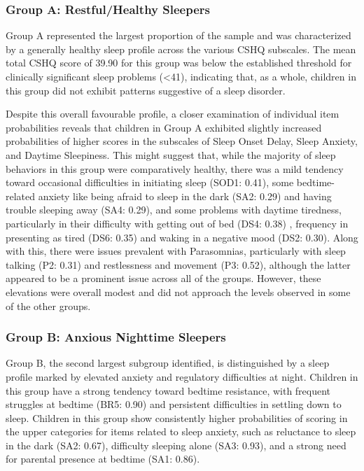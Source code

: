 \documentclass[11pt]{article}
\theoremstyle{plain}
\theoremstyle{definition}
\begin{document}
\subsubsection{Group A: Restful/Healthy Sleepers}
Group A represented the largest proportion of the sample and was characterized by a generally healthy sleep profile across the various CSHQ subscales. The mean total CSHQ score of 39.90 for this group was below the established threshold for clinically significant sleep problems (<41), indicating that, as a whole, children in this group did not exhibit patterns suggestive of a sleep disorder. 

Despite this overall favourable profile, a closer examination of individual item probabilities reveals that children in Group A exhibited slightly increased probabilities of higher scores in the subscales of Sleep Onset Delay, Sleep Anxiety, and Daytime Sleepiness. This might suggest that, while the majority of sleep behaviors in this group were comparatively healthy, there was a mild tendency toward occasional difficulties in initiating sleep (SOD1: 0.41), some bedtime-related anxiety like being afraid to sleep in the dark (SA2: 0.29) and having trouble sleeping away (SA4: 0.29), and some problems with daytime tiredness, particularly in their difficulty with getting out of bed (DS4: 0.38) , frequency in presenting as tired (DS6: 0.35) and waking in a negative mood (DS2: 0.30). Along with this, there were issues prevalent with Parasomnias, particularly with sleep talking (P2: 0.31) and restlessness and movement (P3: 0.52), although the latter appeared to be a prominent issue across all of the groups. However, these elevations were overall modest and did not approach the levels observed in some of the other groups.
\subsubsection{Group B: Anxious Nighttime Sleepers} 
Group B, the second largest subgroup identified, is distinguished by a sleep profile marked by elevated anxiety and regulatory difficulties at night. Children in this group have a strong tendency toward bedtime resistance, with frequent struggles at bedtime (BR5: 0.90) and persistent difficulties in settling down to sleep. Children in this group show consistently higher probabilities of scoring in the upper categories for items related to sleep anxiety, such as reluctance to sleep in the dark (SA2: 0.67), difficulty sleeping alone (SA3: 0.93), and a strong need for parental presence at bedtime (SA1: 0.86).
\end{document}
